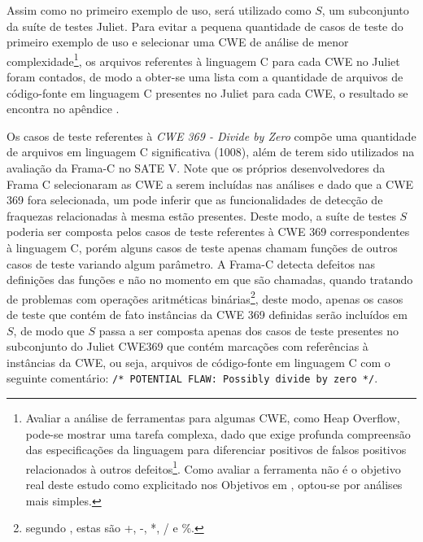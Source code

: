 Assim como no primeiro exemplo de uso, será utilizado como $S$, um subconjunto da suíte de testes Juliet. Para evitar a pequena quantidade de casos de teste do primeiro exemplo de uso e selecionar uma CWE de análise de menor complexidade\footnote{Avaliar a análise de ferramentas para algumas CWE, como Heap Overflow, pode-se mostrar uma tarefa complexa, dado que exige profunda compreensão das especificações da linguagem para diferenciar positivos de falsos positivos relacionados à outros defeitos\footnote{Embora o Juliet apresente apenas 1 defeito por caso de teste, uma ferramenta pode apontar, por exemplo, um defeito relacionado à outra classe de fraquezas no mesmo ponto de entrada do defeito apresentado em um caso de testes, não gerando um positivo para o defeito relevante à análise}. Como avaliar a ferramenta não é o objetivo real deste estudo como explicitado nos Objetivos em , optou-se por análises mais simples.}, os arquivos referentes à linguagem C para cada CWE no Juliet foram contados, de modo a obter-se uma lista com a quantidade de arquivos de código-fonte em linguagem C presentes no Juliet para cada CWE, o resultado se encontra no apêndice .

Os casos de teste referentes à \textit{CWE 369 - Divide by Zero} compõe uma quantidade de arquivos em linguagem C significativa (1008), além de terem sido utilizados na avaliação da Frama-C no SATE V. Note que os próprios desenvolvedores da Frama C selecionaram as CWE a serem incluídas nas análises e dado que a CWE 369 fora selecionada, um pode inferir que as funcionalidades de detecção de fraquezas relacionadas à mesma estão presentes. Deste modo, a suíte de testes $S$ poderia ser composta pelos casos de teste referentes à CWE 369 correspondentes à linguagem C, porém alguns casos de teste apenas chamam funções de outros casos de teste variando algum parâmetro.  A Frama-C detecta defeitos nas definições das funções e não no momento em que são chamadas, quando tratando de problemas com operações aritméticas binárias\footnote{segundo \cite{kernighan}, estas são +, -, *, / e \%.}, deste modo, apenas os casos de teste que contém de fato instâncias da CWE 369 definidas serão incluídos em $S$, de modo que  $S$ passa a ser composta apenas dos casos de teste presentes no subconjunto do Juliet CWE369 que contém marcações com referências à instâncias da CWE, ou seja, arquivos de código-fonte em linguagem C com o seguinte comentário:
  \lstinline{/* POTENTIAL FLAW: Possibly divide by zero */}.

